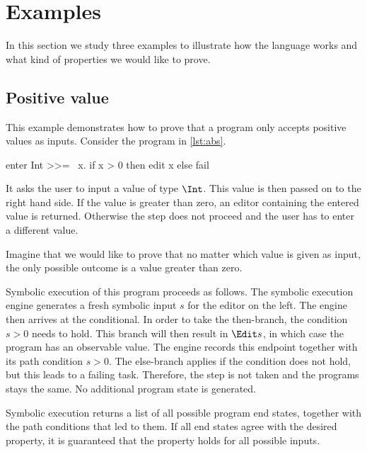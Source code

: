 
\section{Examples}
\label{sec:examples}

In this section we study three examples to illustrate how the language \TOPHAT works and what kind of properties we would like to prove.



\subsection{Positive value}

This example demonstrates how to prove that a program only accepts positive values as inputs.
Consider the program in \cref{lst:abs}.

\begin{TASK}[float=h
            ,caption=A task that only accepts positive values as inputs.
            ,label=lst:abs
            ]
  enter Int >>= \ x. if x > 0 then edit x else fail
\end{TASK}

It asks the user to input a value of type $\Int$.
This value is then passed on to the right hand side.
If the value is greater than zero, an editor containing the entered value is returned.
Otherwise the step does not proceed and the user has to enter a different value.

Imagine that we would like to prove that no matter which value is given as input,
the only possible outcome is a value greater than zero.

Symbolic execution of this program proceeds as follows.
The symbolic execution engine generates a fresh symbolic input $s$ for the editor on the left.
The engine then arrives at the conditional.
In order to take the then-branch, the condition $s > 0$ needs to hold.
This branch will then result in $\Edit s$, in which case the program has an observable value.
The engine records this endpoint together with its path condition $s > 0$.
The else-branch applies if the condition does not hold, but this leads to a failing task.
Therefore, the step is not taken and the programs stays the same.
No additional program state is generated.

Symbolic execution returns a list of all possible program end states, together with the path conditions that led to them.
If all end states agree with the desired property, it is guaranteed that the property holds for all possible inputs.

